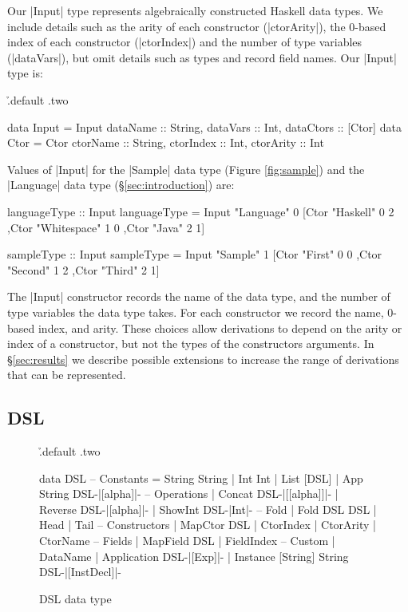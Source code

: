 \documentclass[preprint,draft]{sigplanconf}
\begin{document}
Our |Input| type represents algebraically constructed Haskell data types. We include details such as the arity of each constructor (|ctorArity|), the 0-based index of each constructor (|ctorIndex|) and the number of type variables (|dataVars|), but omit details such as types and record field names. Our |Input| type is:

\h{.default .two}\begin{code}
data Input = Input
    {dataName :: String, dataVars :: Int, dataCtors :: [Ctor]}
data Ctor = Ctor
    {ctorName :: String, ctorIndex :: Int, ctorArity :: Int}
\end{code}

\noindent Values of |Input| for the |Sample| data type (Figure \ref{fig:sample}) and the |Language| data type (\S\ref{sec:introduction}) are:

\begin{code}
languageType :: Input
languageType = Input "Language" 0
    [Ctor "Haskell" 0 2
    ,Ctor "Whitespace" 1 0
    ,Ctor "Java" 2 1]

sampleType :: Input
sampleType = Input "Sample" 1
    [Ctor "First" 0 0
    ,Ctor "Second" 1 2
    ,Ctor "Third" 2 1]
\end{code}

The |Input| constructor records the name of the data type, and the number of type variables the data type takes. For each constructor we record the name, 0-based index, and arity. These choices allow derivations to depend on the arity or index of a constructor, but not the types of the constructors arguments. In \S\ref{sec:results} we describe possible extensions to increase the range of derivations that can be represented.

\subsection{DSL}

\begin{figure}
\h{.default .two}\begin{code}
data DSL
       -- Constants
    =  String String
    |  Int Int
    |  List [DSL]
    |  App String DSL{-|[alpha]|-}
       -- Operations
    |  Concat DSL{-|[[alpha]]|-}
    |  Reverse DSL{-|[alpha]|-}
    |  ShowInt DSL{-|Int|-}
       -- Fold
    |  Fold DSL DSL
    |  Head
    |  Tail
       -- Constructors
    |  MapCtor DSL
    |  CtorIndex
    |  CtorArity
    |  CtorName
       -- Fields
    |  MapField DSL
    |  FieldIndex
       -- Custom
    |  DataName
    |  Application DSL{-|[Exp]|-}
    |  Instance [String] String DSL{-|[InstDecl]|-}
\end{code}
\caption{DSL data type}
\label{fig:dsl}
\end{figure}
\end{document}
